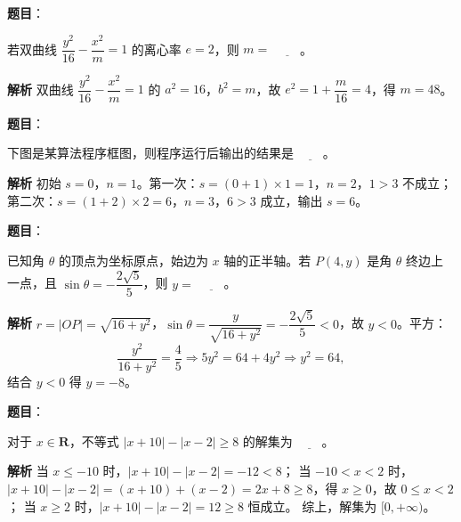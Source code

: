 \begin{answer}

\textbf{题目}：

若双曲线 $\dfrac{y^2}{16}-\dfrac{x^2}{m}=1$ 的离心率 $e=2$，则 $m=$ $\underline{\qquad}$。

\textbf{解析}
双曲线 $\dfrac{y^2}{16}-\dfrac{x^2}{m}=1$ 的 $a^2=16$，$b^2=m$，故 $e^2=1+\dfrac{m}{16}=4$，得 $m=48$。


\end{answer}
\begin{answer}

\textbf{题目}：

下图是某算法程序框图，则程序运行后输出的结果是 $\underline{\qquad}$。
\nopagebreak[4]
\begin{center}\end{center}
\nopagebreak[4]
\textbf{解析}
初始 $s=0$，$n=1$。第一次：$s=(0+1)\times1=1$，$n=2$，$1>3$ 不成立；第二次：$s=(1+2)\times2=6$，$n=3$，$6>3$ 成立，输出 $s=6$。


\end{answer}
\begin{answer}

\textbf{题目}：

已知角 $\theta$ 的顶点为坐标原点，始边为 $x$ 轴的正半轴。若 $P(4,y)$ 是角 $\theta$ 终边上一点，且 $\sin\theta=-\dfrac{2\sqrt5}5$，则 $y=$ $\underline{\qquad}$。

\textbf{解析}
$r=|OP|=\sqrt{16+y^2}$，$\sin\theta=\dfrac{y}{\sqrt{16+y^2}}=-\dfrac{2\sqrt5}5<0$，故 $y<0$。平方：
\nopagebreak[4]
\[\frac{y^2}{16+y^2}=\frac45\Longrightarrow5y^2=64+4y^2\Longrightarrow y^2=64,\]
结合 $y<0$ 得 $y=-8$。


\end{answer}
\begin{answer}

\textbf{题目}：

对于 $x\in\mathbf R$，不等式 $|x+10|-|x-2|\geqslant8$ 的解集为 $\underline{\qquad}$。

\textbf{解析}
当 $x\leqslant-10$ 时，$|x+10|-|x-2|=-12<8$；
当 $-10<x<2$ 时，$|x+10|-|x-2|=(x+10)+(x-2)=2x+8\geqslant8$，得 $x\geqslant0$，故 $0\leqslant x<2$；
当 $x\geqslant2$ 时，$|x+10|-|x-2|=12\geqslant8$ 恒成立。
综上，解集为 $[0,+\infty)$。

\gkanswer{答案：$[0,+\infty)$。}

\end{answer}
